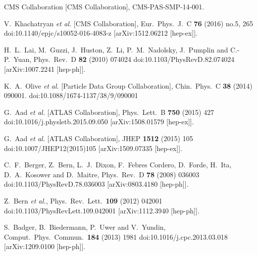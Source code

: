 \documentclass{PoS}
\begin{document}
\begin{thebibliography}{99}
  CMS Collaboration [CMS Collaboration],
  CMS-PAS-SMP-14-001.

  V.~Khachatryan {\it et al.} [CMS Collaboration],
  Eur.\ Phys.\ J.\ C {\bf 76} (2016) no.5,  265
  doi:10.1140/epjc/s10052-016-4083-z
  [arXiv:1512.06212 [hep-ex]].

  H.~L.~Lai, M.~Guzzi, J.~Huston, Z.~Li, P.~M.~Nadolsky, J.~Pumplin and C.-P.~Yuan,
  Phys.\ Rev.\ D {\bf 82} (2010) 074024
  doi:10.1103/PhysRevD.82.074024
  [arXiv:1007.2241 [hep-ph]].

  K.~A.~Olive {\it et al.} [Particle Data Group Collaboration],
  Chin.\ Phys.\ C {\bf 38} (2014) 090001.
  doi:10.1088/1674-1137/38/9/090001

  G.~Aad {\it et al.} [ATLAS Collaboration],
  Phys.\ Lett.\ B {\bf 750} (2015) 427
  doi:10.1016/j.physletb.2015.09.050
  [arXiv:1508.01579 [hep-ex]]. 

  G.~Aad {\it et al.} [ATLAS Collaboration],
  JHEP {\bf 1512} (2015) 105
  doi:10.1007/JHEP12(2015)105
  [arXiv:1509.07335 [hep-ex]].

  C.~F.~Berger, Z.~Bern, L.~J.~Dixon, F.~Febres Cordero, D.~Forde, H.~Ita, D.~A.~Kosower and D.~Maitre,
  Phys.\ Rev.\ D {\bf 78} (2008) 036003
  doi:10.1103/PhysRevD.78.036003
  [arXiv:0803.4180 [hep-ph]].

  Z.~Bern {\it et al.},
  Phys.\ Rev.\ Lett.\  {\bf 109} (2012) 042001
  doi:10.1103/PhysRevLett.109.042001
  [arXiv:1112.3940 [hep-ph]].

  S.~Badger, B.~Biedermann, P.~Uwer and V.~Yundin,
  Comput.\ Phys.\ Commun.\  {\bf 184} (2013) 1981
  doi:10.1016/j.cpc.2013.03.018
  [arXiv:1209.0100 [hep-ph]].


\end{thebibliography}
\end{document}
